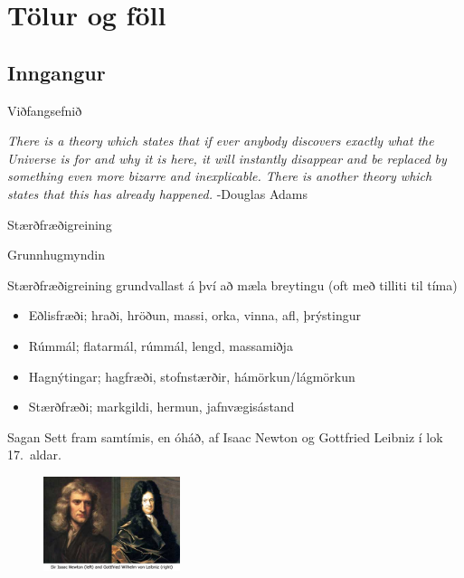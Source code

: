 \documentclass[icelandic,a4paper,12pt]{article}
\date{29. ágúst 2015}
\begin{document}
\section{Tölur og föll}
\subsection*{Inngangur}
\begin{frame}{Viðfangsefnið}
 \begin{block}{}
 \emph{There is a theory which states that if ever anybody discovers exactly what the Universe is for and 
  why it is here, it will instantly disappear and be replaced by something even more bizarre and inexplicable. 
  There is another theory which states that this has already happened.} \hfill -Douglas Adams
 \end{block}

\end{frame}

\begin{frame}{Stærðfræðigreining}

\begin{block}{Grunnhugmyndin}

 Stærðfræðigreining grundvallast á því að mæla breytingu (oft með tilliti til tíma)
 \begin{itemize}
  \item Eðlisfræði; hraði, hröðun, massi, orka, vinna, afl, þrýstingur
  \item Rúmmál; flatarmál, rúmmál, lengd, massamiðja
  \item Hagnýtingar; hagfræði, stofnstærðir, hámörkun/lágmörkun 
  \item Stærðfræði; markgildi, hermun, jafnvægisástand
 \end{itemize}
  \end{block}

\pause


\begin{block}{Sagan}
 Sett fram samtímis, en óháð, af Isaac Newton og Gottfried Leibniz í lok 17.~aldar.
\end{block}

\begin{figure}
 \includegraphics[width=4cm]{./myndir/kafli01/01_NewtonLeibniz.jpg}
\end{figure}



\end{frame}
\end{document}
